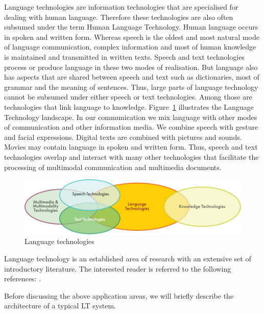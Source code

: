 \begin{multicols}{2}

Language technologies are information technologies that are specialised for dealing with human language. Therefore these technologies are also often subsumed under the term Human Language Technology. Human language occurs in spoken and written form. Whereas speech is the oldest and most natural mode of language communication, complex information and most of human knowledge is maintained and transmitted in written texts. Speech and text technologies process or produce language in these two modes of realisation. But language also has aspects that are shared between speech and text such as dictionaries, most of grammar and the meaning of sentences. Thus, large parts of language technology cannot be subsumed under either speech or text technologies. Among those are technologies that link language to knowledge. Figure~\ref{fig:ltincontext_en}  illustrates the Language Technology landscape. In our communication we mix language with other modes of communication and other information media. We combine speech with gesture and facial expressions. Digital texts are combined with pictures and sounds. Movies may contain language in spoken and written form. Thus, speech and text technologies overlap and interact with many other technologies that facilitate the processing of multimodal communication and multimedia documents.  

\begin{figure}[htb]
  \center
  \includegraphics[width=\textwidth]{../_media/english/language_technologies}
  \caption{Language technologies}
  \label{fig:ltincontext_en}
\end{figure}

Language technology is an established area of research with an extensive set of introductory literature. The interested reader is referred to the following references:  \cite{jurafsky-martin01, manning-schuetze1, lt-world1, lt-survey1}.

Before discussing the above application areas, we will briefly describe the architecture of a typical LT system.


\end{multicols}
